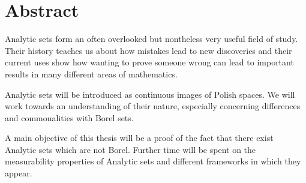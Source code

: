 \section*{Abstract}

Analytic sets form an often overlooked but nontheless very useful field of study. 
Their history teaches us about how mistakes lead to new discoveries and their current uses show how wanting to prove someone wrong can lead to important results in many different areas of mathematics. 

Analytic sets will be introduced as continuous images of Polish spaces. 
We will work towards an understanding of their nature, especially concerning differences and commonalities with Borel sets.

A main objective of this thesis will be a  proof of the fact that there exist Analytic sets which are not Borel. 
Further time will be spent on the measurability properties of Analytic sets and different frameworks in which they appear.

